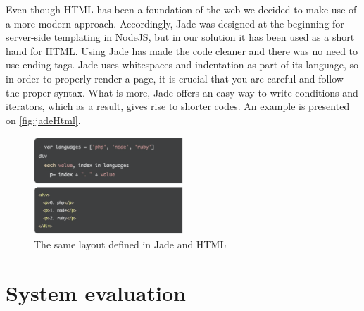 Even though HTML has been a foundation of the web we decided to make use of a more modern approach. Accordingly, Jade was designed at the beginning for server-side templating in NodeJS, but in our solution it has been used as a short hand for HTML. Using Jade has made the code cleaner and there was no need to use ending tags. Jade uses whitespaces and indentation as part of its language, so in order to properly render a page, it is crucial that you are careful and follow the proper syntax. What is more, Jade offers an easy way to write conditions and iterators, which as a result, gives rise to shorter codes. An example is presented on \autoref{fig:jadeHtml}.

\begin{figure}[ht!]
\caption{The same layout defined in Jade and HTML}
\label{fig:jadeHtml}
\centering
\includegraphics[width=0.5\textwidth]{img/htmlJade}
\end{figure}

\section{System evaluation}


